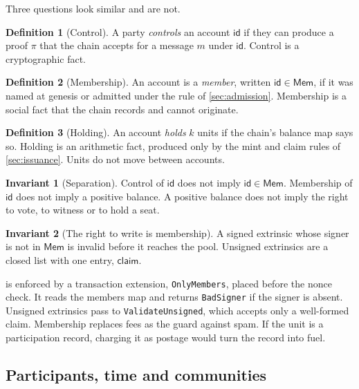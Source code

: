 \documentclass[11pt,a4paper]{article}
\theoremstyle{definition}
\newtheorem{definition}{Definition}[section]
\newtheorem{invariant}{Invariant}[section]
\theoremstyle{plain}
\theoremstyle{remark}
\newcommand{\mem}{\mathsf{Mem}}
\newcommand{\id}{\mathsf{id}}
\begin{document}
Three questions look similar and are not.

\begin{definition}[Control]
A party \emph{controls} an account $\id$ if they can produce a proof $\pi$ that the chain accepts for a message $m$ under $\id$. Control is a cryptographic fact.
\end{definition}

\begin{definition}[Membership]
An account is a \emph{member}, written $\id \in \mem$, if it was named at genesis or admitted under the rule of \cref{sec:admission}. Membership is a social fact that the chain records and cannot originate.
\end{definition}

\begin{definition}[Holding]
An account \emph{holds} $k$ units if the chain's balance map says so. Holding is an arithmetic fact, produced only by the mint and claim rules of \cref{sec:issuance}. Units do not move between accounts.
\end{definition}

\begin{invariant}[Separation]
\label{inv:separation}
Control of $\id$ does not imply $\id \in \mem$. Membership of $\id$ does not imply a positive balance. A positive balance does not imply the right to vote, to witness or to hold a seat.
\end{invariant}

\begin{invariant}[The right to write is membership]
\label{inv:write}
A signed extrinsic whose signer is not in $\mem$ is invalid before it reaches the pool. Unsigned extrinsics are a closed list with one entry, $\mathsf{claim}$.
\end{invariant}

 is enforced by a transaction extension, \texttt{OnlyMembers}, placed before the nonce check. It reads the members map and returns \texttt{BadSigner} if the signer is absent. Unsigned extrinsics pass to \texttt{ValidateUnsigned}, which accepts only a well-formed claim. Membership replaces fees as the guard against spam. If the unit is a participation record, charging it as postage would turn the record into fuel.

\subsection{Participants, time and communities}
\end{document}
